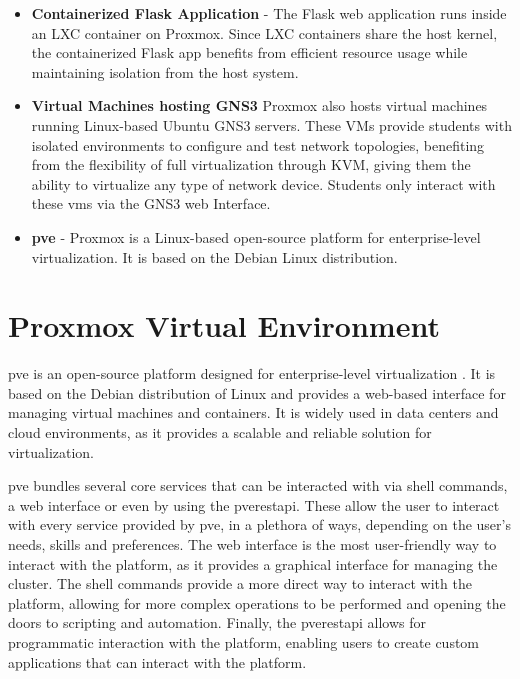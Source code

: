 \begin{itemize}
  \item \textbf{Containerized Flask Application}  - The Flask web application runs inside 
  an LXC container on Proxmox. Since LXC containers share the host kernel, the containerized Flask app benefits from 
  efficient resource usage while maintaining isolation from the host system.
  \item \textbf{Virtual Machines hosting GNS3} Proxmox also hosts virtual machines running Linux-based Ubuntu GNS3 servers. 
  These VMs provide students with isolated environments to configure and test network topologies, benefiting from the 
  flexibility of full virtualization through KVM, giving them the ability to virtualize any type of network device.
  Students only interact with these \ac{vm}s via the GNS3 web Interface.
  \item \textbf{\ac{pve}} - Proxmox is a Linux-based open-source platform for enterprise-level virtualization. It is based
  on the Debian Linux distribution.
\end{itemize}


\section{Proxmox Virtual Environment} 
\ac{pve} is an open-source platform designed for enterprise-level virtualization \cite{proxmox2025}. It is based on the Debian
distribution of Linux and provides a web-based interface for managing virtual machines and containers. It is widely used
in data centers and cloud environments, as it provides a scalable and reliable solution for virtualization.

\ac{pve} bundles several core services that can be interacted with via shell commands, a web interface or even by using
the \ac{pve}\ac{rest}\ac{api}.
These allow the user to interact with every service provided by \ac{pve}, in a plethora of ways, depending on the user's
needs, skills and preferences. The web interface is the most user-friendly way to interact with the platform, as it
provides a graphical interface for managing the cluster. The shell commands provide a more direct way to interact with the
platform, allowing for more complex operations to be performed and opening the doors to scripting and automation. Finally,
the \ac{pve}\ac{rest}\ac{api} allows for programmatic interaction with the platform, enabling users to create custom
applications that can interact with the platform.


